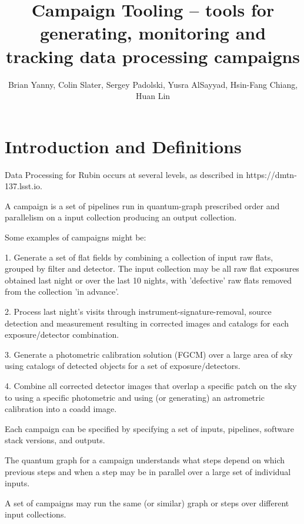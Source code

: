 \documentclass[DM,authoryear,toc]{lsstdoc}
\title{Campaign Tooling -- tools for generating, monitoring and tracking data processing campaigns}
\author{%
Brian Yanny, Colin Slater, Sergey Padolski, Yusra AlSayyad, Hsin-Fang Chiang, Huan Lin
}
\date{\vcsDate}
\begin{document}
\maketitle


\section{Introduction and Definitions}

Data Processing for Rubin occurs at several levels,
as described in https://dmtn-137.lsst.io. 

A campaign is a set of pipelines run in quantum-graph prescribed order and
parallelism on a input collection producing an output collection.

Some examples of campaigns might be:

1. Generate a set of flat fields by combining a collection of input raw flats,
grouped by filter and detector.  The input collection may be all raw flat
exposures obtained last night or over the last 10 nights, with 'defective'
raw flats removed from the collection 'in advance'.

2.  Process last night's visits through instrument-signature-removal, source 
detection and measurement resulting in corrected images and catalogs
for each exposure/detector combination.

3. Generate a photometric calibration solution (FGCM) over a large area
of sky using catalogs of detected objects for a set of exposure/detectors.

4. Combine all corrected detector images that overlap a specific patch
on the sky to using a specific photometric and using (or generating) an 
astrometric calibration into a coadd image.

Each campaign can be specified by specifying a set of inputs, pipelines,
software stack versions, and outputs.

The quantum graph for a campaign understands what steps depend on which
previous steps and when a step may be in parallel over a large set of
individual inputs.

A set of campaigns may run the same (or similar) graph or steps over 
different input collections.
\end{document}
